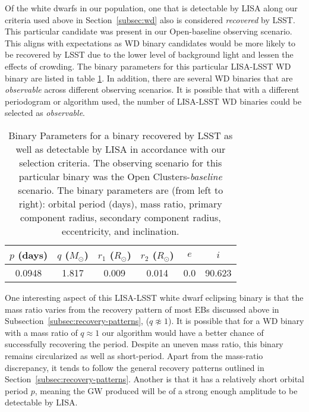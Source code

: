 \documentclass[twocolumn]{aastex63}
\begin{document}
Of the white dwarfs in our population, one that is detectable by LISA along our criteria used above in Section~\ref{subsec:wd} also is considered \textit{recovered} by LSST. This particular candidate was present in our Open-baseline observing scenario. This aligns with expectations as WD binary candidates would be more likely to be recovered by LSST due to the lower level of background light and lessen the effects of crowding. The binary parameters for this particular LISA-LSST WD binary are listed in table \ref{tab:lsst-lisa binary}. In addition, there are several WD binaries that are \textit{observable} across different observing scenarios. It is possible that with a different periodogram or algorithm used, the number of LISA-LSST WD binaries could be selected as \textit{observable}.

\begin{table}[t]
    \centering
    \begin{tabular}{c|c|c|c|c|c}
        $p$ (days) & $q$ ($M_{\odot}$) & $r_1$ ($R_{\odot}$) & $r_2$ ($R_{\odot}$) & $e$ & $i$ \\
        \hline
        0.0948 & 1.817 & 0.009 & 0.014 & 0.0 & 90.623 \\
    \end{tabular}
    \caption{Binary Parameters for a binary recovered by LSST as well as detectable by LISA in accordance with our selection criteria. The observing scenario for this particular binary was the Open Clusters-\textit{baseline} scenario. The binary parameters are (from left to right): orbital period (days), mass ratio, primary component radius, secondary component radius, eccentricity, and inclination.}
    \label{tab:lsst-lisa binary}
\end{table}

One interesting aspect of this LISA-LSST white dwarf eclipsing binary is that the mass ratio varies from the recovery pattern of most EBs discussed above in Subsection~\ref{subsec:recovery-patterns}, ($q \not\approx 1$). It is possible that for a WD binary with a mass ratio of $q \approx 1$  our algorithm would have a better chance of successfully recovering the period. Despite an uneven mass ratio, this binary remains circularized as well as short-period. Apart from the mass-ratio discrepancy, it tends to follow the general recovery patterns outlined in Section~\ref{subsec:recovery-patterns}. Another is that it has a relatively short orbital period $p$, meaning the GW produced will be of a strong enough amplitude to be detectable by LISA. 
\end{document}

